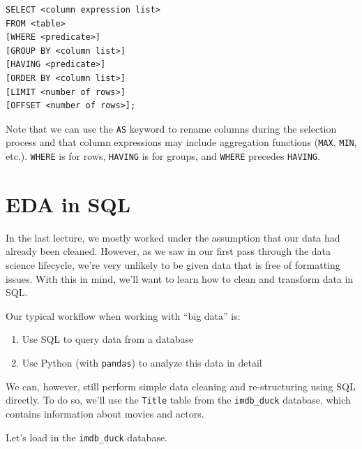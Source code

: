 \documentclass[
  letterpaper,
  DIV=11,
  numbers=noendperiod]{scrreprt}
\providecommand{\tightlist}{%
  \setlength{\itemsep}{0pt}\setlength{\parskip}{0pt}}\usepackage{longtable,booktabs,array}
\begin{document}
\begin{verbatim}
SELECT <column expression list>
FROM <table>
[WHERE <predicate>]
[GROUP BY <column list>]
[HAVING <predicate>]
[ORDER BY <column list>]
[LIMIT <number of rows>]
[OFFSET <number of rows>];
\end{verbatim}

Note that we can use the \texttt{AS} keyword to rename columns during
the selection process and that column expressions may include
aggregation functions (\texttt{MAX}, \texttt{MIN}, etc.). \texttt{WHERE}
is for rows, \texttt{HAVING} is for groups, and \texttt{WHERE} precedes
\texttt{HAVING}.

\section{EDA in SQL}\label{eda-in-sql}

In the last lecture, we mostly worked under the assumption that our data
had already been cleaned. However, as we saw in our first pass through
the data science lifecycle, we're very unlikely to be given data that is
free of formatting issues. With this in mind, we'll want to learn how to
clean and transform data in SQL.

Our typical workflow when working with ``big data'' is:

\begin{enumerate}
\def\labelenumi{\arabic{enumi}.}
\tightlist
\item
  Use SQL to query data from a database
\item
  Use Python (with \texttt{pandas}) to analyze this data in detail
\end{enumerate}

We can, however, still perform simple data cleaning and re-structuring
using SQL directly. To do so, we'll use the \texttt{Title} table from
the \texttt{imdb\_duck} database, which contains information about
movies and actors.

Let's load in the \texttt{imdb\_duck} database.
\end{document}
